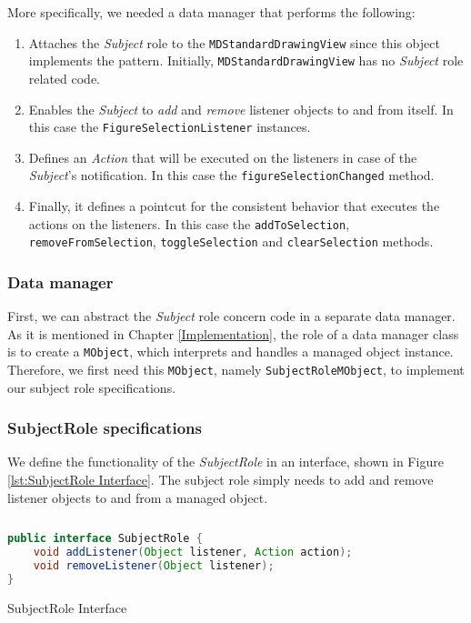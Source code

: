 More specifically, we needed a data manager that performs the following:

\begin{enumerate}
	\item Attaches the \textit{Subject} role to the \texttt{MDStandardDrawingView} since this object implements the pattern.
	Initially, \texttt{MDStandardDrawingView} has no \textit{Subject} role related code.

	\item Enables the \textit{Subject} to \textit{add} and \textit{remove} listener objects to and from itself. 
	\newline
	In this case the \texttt{FigureSelectionListener} instances.

	\item Defines an \textit{Action} that will be executed on the listeners in case of the \textit{Subject}'s notification.
	\newline
	In this case the \texttt{figureSelectionChanged} method.

	\item Finally, it defines a pointcut for the consistent behavior that executes the actions on the listeners. 
	In this case the \texttt{addToSelection}, \texttt{removeFromSelection}, \texttt{toggleSelection} and \texttt{clearSelection} methods.
\end{enumerate}

\subsubsection{Data manager}
First, we can abstract the \textit{Subject} role concern code in a separate data manager.
As it is mentioned in Chapter \ref{Implementation}, the role of a data manager class is to create a \texttt{MObject}, which interprets and handles a managed object instance.
Therefore, we first need this \texttt{MObject}, namely \texttt{SubjectRoleMObject}, to implement our subject role specifications.

\subsubsection{SubjectRole specifications}
We define the functionality of the \textit{SubjectRole} in an interface, shown in Figure \ref{lst:SubjectRole Interface}.
The subject role simply needs to add and remove listener objects to and from a managed object.

\begin{sourcecode} [H]
	\begin{lstlisting}[language=Java, escapechar=|]
public interface SubjectRole {
	void addListener(Object listener, Action action);
	void removeListener(Object listener);
}
	\end{lstlisting}
	\caption{SubjectRole Interface}
	\label{lst:SubjectRole Interface}
\end{sourcecode}

